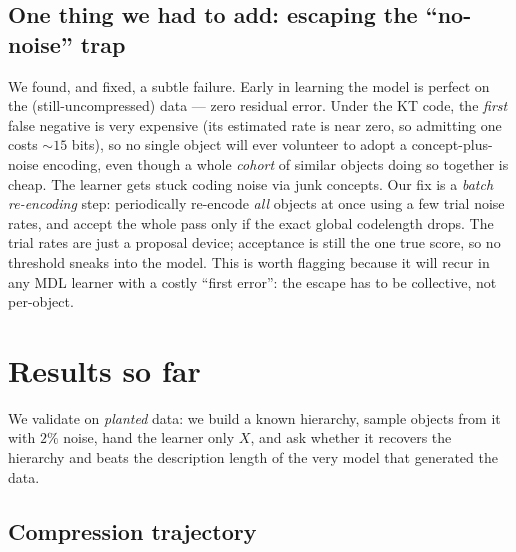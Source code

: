 \documentclass[11pt]{article}
\begin{document}
\subsection{One thing we had to add: escaping the ``no-noise'' trap}

We found, and fixed, a subtle failure. Early in learning the model is perfect on
the (still-uncompressed) data --- zero residual error. Under the KT code, the
\emph{first} false negative is very expensive (its estimated rate is near zero,
so admitting one costs $\sim$$15$ bits), so no single object will ever
volunteer to adopt a concept-plus-noise encoding, even though a whole
\emph{cohort} of similar objects doing so together is cheap. The learner gets
stuck coding noise via junk concepts. Our fix is a \emph{batch re-encoding}
step: periodically re-encode \emph{all} objects at once using a few trial noise
rates, and accept the whole pass only if the exact global codelength drops. The
trial rates are just a proposal device; acceptance is still the one true score,
so no threshold sneaks into the model. This is worth flagging because it will
recur in any MDL learner with a costly ``first error'': the escape has to be
collective, not per-object.

\section{Results so far}

We validate on \emph{planted} data: we build a known hierarchy, sample objects
from it with $2\%$ noise, hand the learner only $X$, and ask whether it recovers
the hierarchy and beats the description length of the very model that generated
the data.

\subsection{Compression trajectory}
\end{document}
